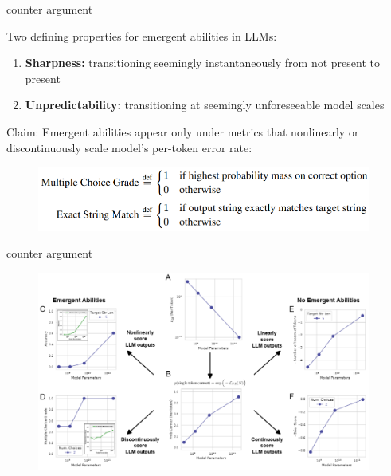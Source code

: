 

\begin{vbframe}{counter argument}


\vfill

Two defining properties for emergent abilities in LLMs:

\begin{enumerate}
%
\item \textbf{Sharpness:} transitioning seemingly instantaneously from not present to present
%
\item \textbf{Unpredictability:} transitioning at seemingly unforeseeable model scales
%
\end{enumerate}

\vskip5mm

Claim: Emergent abilities appear only under metrics that nonlinearly or discontinuously scale model's per-token error rate:

	\begin{figure}
		\centering
		\includegraphics[width = 11cm]{figure/metrics.png} \\ 
	\end{figure}

\vfill

\end{vbframe}


\begin{vbframe}{counter argument}

\vfill

	\begin{figure}
		\centering
		\includegraphics[width = 11cm]{figure/emergent_experiments.png}\\ 
	\end{figure}

\vfill

\end{vbframe}

